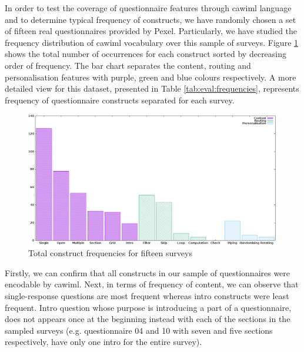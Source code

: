 	In order to test the coverage of questionnaire features through \gls{cawiml} language and to determine typical frequency of constructs, we have randomly chosen a set of fifteen real questionnaires provided by Pexel. Particularly, we have studied the frequency distribution of \gls{cawiml} vocabulary over this sample of surveys. Figure \ref{fig:eval:frequencies} shows the total number of occurrences for each construct sorted by decreasing order of frequency. The bar chart separates the content, routing and personalisation features with purple, green and blue colours respectively. A more detailed view for this dataset, presented in Table \ref{tab:eval:frequencies}, represents frequency of questionnaire constructs separated for each survey. %

	\begin{figure}[H]
	\centering
	\includegraphics[width=\textwidth]{eval/img/surveyfrequencies.png}
	\caption{Total construct frequencies for fifteen surveys}
	\label{fig:eval:frequencies}
	\end{figure}

	

	Firstly, we can confirm that all constructs in our sample of questionnaires were encodable by \gls{cawiml}. Next, in terms of frequency of content, we can observe that single-response questions are most frequent whereas intro constructs were least frequent. Intro question whose purpose is introducing a part of a questionnaire, does not appears once at the beginning instead with each of the sections in the sampled surveys (e.g. questionnaire 04 and 10 with seven and five sections respectively, have only one intro for the entire survey).

